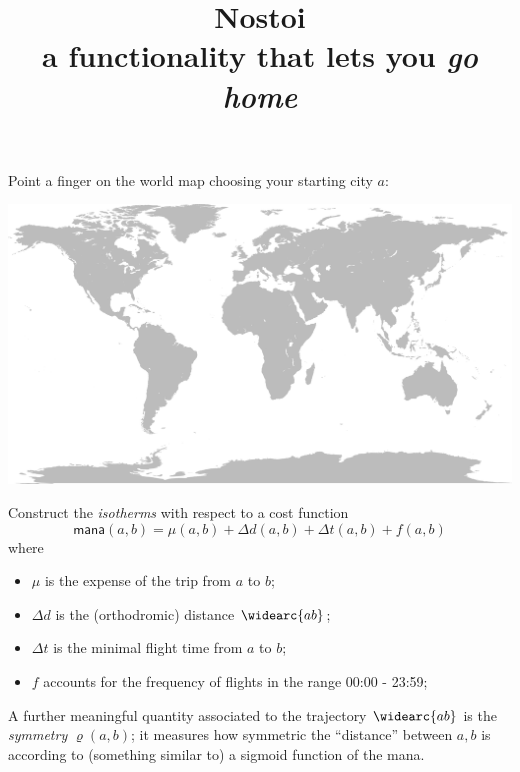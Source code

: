 \documentclass{article}
\title{Nostoi\\ \normalsize a functionality that lets you \emph{go home}}
\begin{document}
\maketitle
Point a finger on the world map choosing your starting city $a$:
\begin{center}
  \includegraphics[width=.9\textwidth]{world}
\end{center}
Construct the \emph{isotherms} with respect to a cost function
\[
  \textsf{mana}(a,b) = \mu(a,b) + \Delta d(a,b) + \Delta t(a,b) + f(a,b) %
\] where
\begin{itemize}
  \item $\mu$ is the expense of the trip from $a$ to $b$;
  \item $\Delta d$ is the (orthodromic) distance $\widearc{ab}$;
  \item $\Delta t$ is the minimal flight time from $a$ to $b$;
  \item $f$ accounts for the frequency of flights in the range 00:00 - 23:59;
\end{itemize}
A further meaningful quantity associated to the trajectory $\widearc{ab}$ is the \emph{symmetry} $\varrho(a,b)$; it measures how symmetric the ``distance'' between $a,b$ is according to (something similar to) a sigmoid function of the mana.
\end{document}
